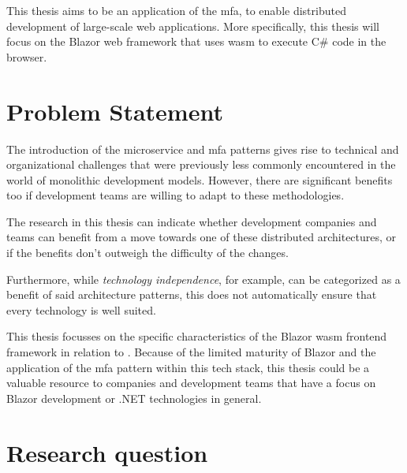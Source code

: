 This thesis aims to be an application of the \gls{mfa}, to enable distributed
development of large-scale web applications. More specifically, this thesis will
focus on the Blazor web framework that uses
\gls{wasm} to execute
C\# code in the browser. 

\section{Problem Statement}
\label{sec:problem-statement}


The introduction of the \gls{microservice} and \gls{mfa} patterns gives rise to
technical and organizational challenges that were previously less commonly
encountered in the world of \gls{monolithic} development models. However, there
are significant benefits too if development teams are willing to adapt to these
methodologies. 

The research in this thesis can indicate whether development companies and teams
can benefit from a move towards one of these distributed architectures, or if
the benefits don't outweigh the difficulty of the changes.

Furthermore, while \textit{technology independence}, for example, can be
categorized as a benefit of said architecture patterns, this does not
automatically ensure that every technology is well suited. 

This thesis focusses on the specific characteristics of the Blazor \gls{wasm}
\gls{frontend} framework in relation to . Because of
the limited maturity of Blazor and the application of the \gls{mfa} pattern
within this tech stack, this thesis could be a valuable resource to companies
and development teams that have a focus on Blazor development or .NET
technologies in general.

\section{Research question}
\label{sec:research-question}

